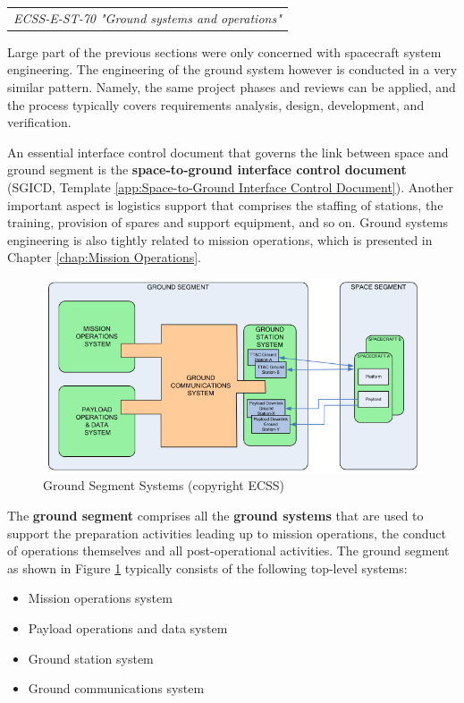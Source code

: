\begin{tabular}{l}
\textit{ECSS-E-ST-70 "Ground systems and operations" \cite{ECSS-E-ST-70}}
\end{tabular}

Large part of the previous sections were only concerned with spacecraft system engineering. The engineering of the ground system however is conducted in a very similar pattern. Namely, the same project phases and reviews can be applied, and the process typically covers requirements analysis, design, development, and verification. 

An essential interface control document that governs the link between space and ground segment is the \textbf{space-to-ground interface control document} (SGICD, Template \ref{app:Space-to-Ground Interface Control Document}). Another important aspect is logistics support that comprises the staffing of stations, the training, provision of spares and support equipment, and so on. Ground systems engineering is also tightly related to mission operations, which is presented in Chapter \ref{chap:Mission Operations}.

\begin{figure}[h]
\centering\includegraphics[scale=0.5]{fig/ground_segment_systems}
\caption{Ground Segment Systems (copyright ECSS)}
\label{fig:Ground Segment Systems}
\end{figure}

The \textbf{ground segment} comprises all the \textbf{ground systems} that are used to support the preparation activities leading up to mission operations, the conduct of operations themselves and all post-operational activities. The ground segment as shown in Figure \ref{fig:Ground Segment Systems} typically consists of the following top-level systems:

\begin{itemize}
\item Mission operations system
\item Payload operations and data system
\item Ground station system
\item Ground communications system
\end{itemize}

